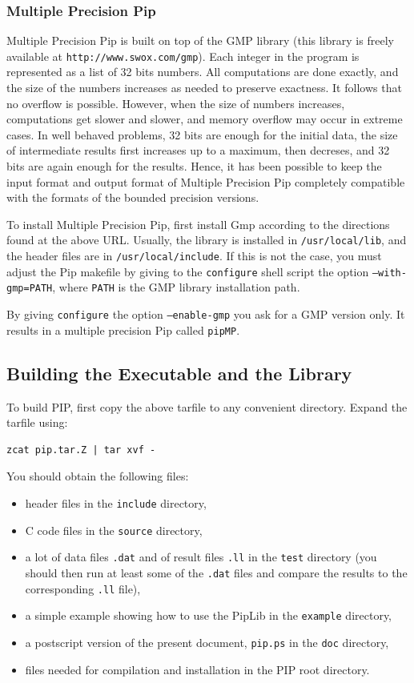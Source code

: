 \documentclass[12pt,a4paper]{article}
\begin{document}
\subsubsection{Multiple Precision Pip}
Multiple Precision Pip is built on top of the GMP library
(this library is freely available at {\tt http://www.swox.com/gmp}). 
Each integer in the program is represented as a list of 32 bits numbers.
All computations are done exactly, and the size of the numbers increases
as needed to preserve exactness. It follows that no overflow is possible.
However, when the size of numbers increases, computations get slower and
slower, and memory overflow may occur in extreme cases. In well behaved
problems, 32 bits are enough for the initial data, the size of intermediate
results first increases up to a maximum, then decreses, and 32 bits
are again enough for the results. Hence, it has been possible to keep
the input format and output format of Multiple Precision Pip completely
compatible with the formats of the bounded precision versions.

To install Multiple Precision Pip, first install Gmp according to the
directions found at the above URL. Usually, the library is installed
in {\tt /usr/local/lib}, and the header files are in {\tt /usr/local/include}.
If this is not the case, you must adjust the Pip makefile by giving
to the {\tt configure} shell script the option {\tt --with-gmp=PATH}, where
{\tt PATH} is the GMP library installation path.

By giving {\tt configure} the option {\tt --enable-gmp} you ask
for a GMP version only. It results in a multiple precision Pip
called {\tt pipMP}.


\subsection{Building the Executable and the Library}

To build PIP, first copy the above tarfile to any convenient directory.
Expand the tarfile using:
\begin{verbatim}
zcat pip.tar.Z | tar xvf -
\end{verbatim}
You should obtain the following files:
\begin{itemize}
\item header files in the {\tt include} directory,
\item C code files in the {\tt source} directory,
\item a lot of data files {\tt *.dat} and of result files {\tt *.ll}
      in the {\tt test} directory (you should then run at least some of
      the {\tt *.dat} files and compare the results to the corresponding
      {\tt *.ll} file),
\item a simple example showing how to use the PipLib in the {\tt example} directory,
\item a postscript version of the present document, {\tt pip.ps} in the
      {\tt doc} directory,
\item files needed for compilation and installation in the PIP
      root directory.
\end{itemize}
\end{document}
